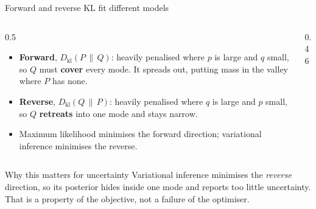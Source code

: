 \documentclass[aspectratio=169,9pt]{beamer}
\newcommand{\orange}[1]{\textcolor{AmazonOrange}{\textbf{#1}}}
\newcommand{\blue}[1]{\textcolor{densityblue}{\textbf{#1}}}
\newcommand{\KL}[2]{D_{\mathrm{kl}}\!\left(#1 \,\|\, #2\right)}
\begin{document}
\begin{frame}{Forward and reverse KL fit different models}
\begin{columns}[T,totalwidth=\textwidth]
\begin{column}{0.5\textwidth}
\vspace{0.1cm}
\begin{itemize}
    \item \orange{Forward}, $\KL{P}{Q}$: heavily penalised where $p$ is large and $q$ small, so $Q$ must
    \blue{cover} every mode. It spreads out, putting mass in the valley where $P$ has none.
    \pause
    \item \orange{Reverse}, $\KL{Q}{P}$: heavily penalised where $q$ is large and $p$ small, so $Q$
    \blue{retreats} into one mode and stays narrow.
    \pause
    \item Maximum likelihood minimises the forward direction; variational inference minimises the reverse.
\end{itemize}
\end{column}
\begin{column}{0.46\textwidth}
\centering
\vspace{0.3cm}
\end{column}
\end{columns}
\vspace{0.02cm}
\pause
\begin{alertblock}{Why this matters for uncertainty}
Variational inference minimises the \textit{reverse} direction, so its posterior hides inside one mode and
reports too little uncertainty. That is a property of the objective, not a failure of the optimiser.
\end{alertblock}
\end{frame}
\end{document}
